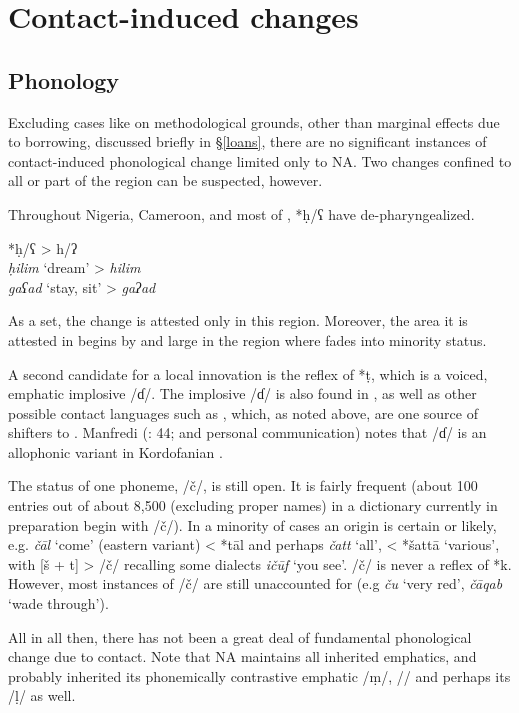 \documentclass[output=paper]{langsci/langscibook}
\begin{document}
\section{Contact-induced changes
}

\subsection{Phonology}
\label{phon}

Excluding cases like  on methodological grounds, other than marginal effects due to borrowing, discussed briefly in §\ref{loans}, there are no significant instances of contact-induced phonological change limited only to NA. Two changes confined to all or part of the  region can be suspected, however.

Throughout Nigeria, Cameroon, and most of  , *ḥ/ʕ have de-{pharyngealized}.

\ea
*\textup{ḥ/ʕ} > h/ʔ\\
         \textit{ḥilim} ‘dream’ > \textit{hilim}\\
        \textit{gaʕad} ‘stay, sit’ > \textit{gaʔad}
\z

As a set, the change is attested only in this region. Moreover, the area it is attested in begins by and large in the region where  fades into minority status.


A second candidate for a local  innovation is the reflex of *ṭ, which is a voiced, {emphatic} implosive /ɗ/. The implosive /ɗ/ is also found in , as well as other possible contact languages such as , which, as noted above, are one source of shifters to . Manfredi (\citeyear{Manfredi2010}: 44; and personal communication) notes that /ɗ/ is an allophonic variant in Kordofanian  .

The status of one {phoneme}, /č/, is still open. It is fairly frequent (about 100 entries out of about 8,500 (excluding proper names) in a dictionary currently in preparation begin with /č/). In a minority of cases an  origin is certain or likely, e.g. \textit{čāl} ‘come’ (eastern variant) < *tāl and perhaps \textit{čatt} ‘all’, < *šattā ‘various’, with [š + t] > /č/ recalling some  dialects \textit{ičūf} ‘you see’. /č/ is never a reflex of *k. However, most instances of /č/ are still unaccounted for (e.g \textit{ču} ‘very red’, \textit{čāqab} ‘wade through’).

All in all then, there has not been a great deal of fundamental phonological change due to contact. Note that NA maintains all inherited emphatics, and probably inherited its phonemically contrastive {emphatic} /ṃ/, /{\R}/ and perhaps its /ḷ/ as well.
\end{document}
